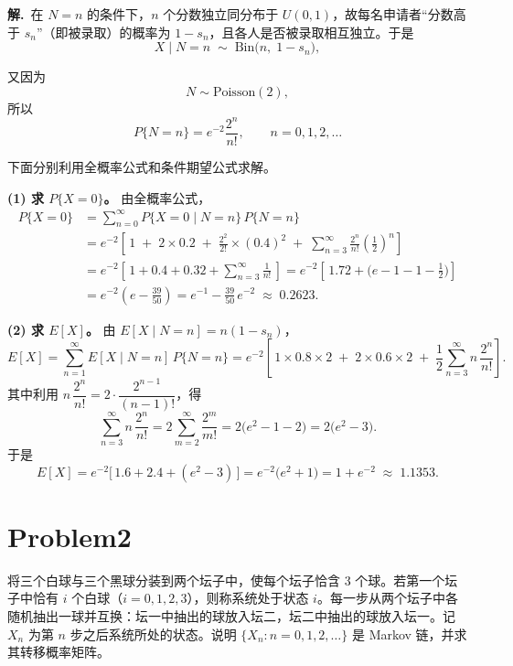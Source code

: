 \documentclass[12pt,a4paper]{article}
\begin{document}
\begin{answerbox}
\textbf{解.}\ 在 $N=n$ 的条件下，$n$ 个分数独立同分布于 $U(0,1)$，故每名申请者“分数高于 $s_n$”（即被录取）的概率为 $1-s_n$，且各人是否被录取相互独立。于是
\[
X \mid N=n \;\sim\; \mathrm{Bin}\big(n,\; 1-s_n\big),
\]

又因为
\[
N\sim \mathrm{Poisson}(2),
\]
所以
\[
P\{N=n\}=e^{-2}\frac{2^n}{n!},
\qquad n=0,1,2,\ldots
\]

下面分别利用全概率公式和条件期望公式求解。

\textbf{(1) 求 $P\{X=0\}$。} 由全概率公式，
\begin{align*}
P\{X=0\}
&= \sum_{n=0}^{\infty} P\{X=0 \mid N=n\}\, P\{N=n\} \\
&= e^{-2}\left[\,1 \;+\; 2\times 0.2 \;+\; \frac{2^2}{2!}\times(0.4)^2 \;+\; \sum_{n=3}^{\infty} \frac{2^n}{n!}\left(\frac{1}{2}\right)^{\!n} \right] \\
&= e^{-2}\left[\,1+0.4+0.32+\sum_{n=3}^{\infty}\frac{1}{n!}\,\right]
= e^{-2}\left[\,1.72+\Big(e-1-1-\frac12\Big)\right] \\
&= e^{-2}\left(e-\frac{39}{50}\right)
= e^{-1}-\frac{39}{50}\,e^{-2}
\;\approx\; 0.2623 .
\end{align*}

\textbf{(2) 求 $E[X]$。} 由 $E[X\mid N=n]=n(1-s_n)$，
\[
E[X]
= \sum_{n=1}^{\infty} E[X\mid N=n]\,P\{N=n\}
= e^{-2}\left[\,1\times 0.8\times 2 \;+\; 2\times 0.6\times 2 \;+\; \frac12\sum_{n=3}^{\infty} n\,\frac{2^n}{n!}\right].
\]
其中利用 $n\,\dfrac{2^n}{n!}=2\cdot\dfrac{2^{n-1}}{(n-1)!}$，得
\[
\sum_{n=3}^{\infty} n\,\frac{2^n}{n!}
= 2\sum_{m=2}^{\infty}\frac{2^m}{m!}
= 2\big(e^2-1-2\big)
= 2\big(e^2-3\big).
\]
于是
\[
E[X]
= e^{-2}\big[\,1.6+2.4+(e^2-3)\,\big]
= e^{-2}\big(e^2+1\big)
= 1+e^{-2}
\;\approx\; 1.1353 .
\]
\end{answerbox}


\section{Problem2}

将三个白球与三个黑球分装到两个坛子中，使每个坛子恰含 3 个球。若第一个坛子中恰有 $i$ 个白球（$i=0,1,2,3$），则称系统处于状态 $i$。每一步从两个坛子中各随机抽出一球并互换：坛一中抽出的球放入坛二，坛二中抽出的球放入坛一。记 $X_n$ 为第 $n$ 步之后系统所处的状态。说明 $\{X_n : n=0,1,2,\ldots\}$ 是 Markov 链，并求其转移概率矩阵。
\end{document}
